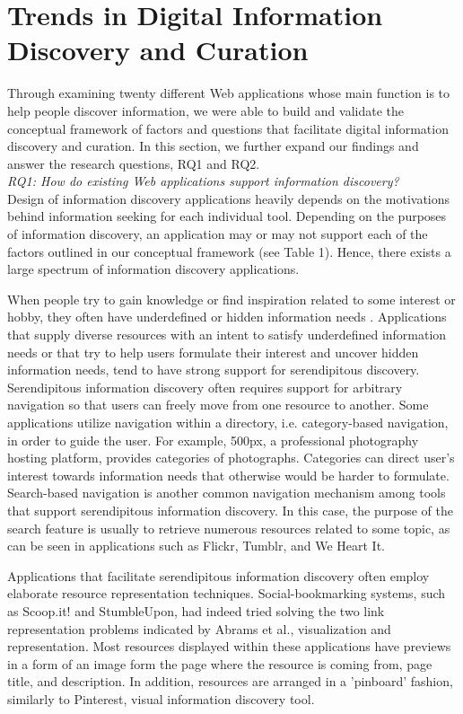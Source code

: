 \documentclass{casconpaper}
\begin{document}
{\section{Trends in Digital Information Discovery and Curation}

Through examining twenty different Web applications whose main function is to help people discover information, we were able to build and validate the conceptual framework of factors and questions that facilitate digital information discovery and curation. In this section, we further expand our findings and answer the research questions, RQ1 and RQ2. \\

\emph{RQ1: How do existing Web applications support information discovery?} \\

Design of information discovery applications heavily depends on the motivations behind information seeking for each individual tool. Depending on the purposes of information discovery, an application may or may not support each of the factors outlined in our conceptual framework (see Table 1). Hence, there exists a large spectrum of information discovery applications.

When people try to gain knowledge or find inspiration related to some interest or hobby, they often have underdefined or hidden information needs \cite{lindley}. Applications that supply diverse resources with an intent to satisfy underdefined information needs or that try to help users formulate their interest and uncover hidden information needs, tend to have strong support for serendipitous discovery. Serendipitous information discovery often requires support for arbitrary navigation so that users can freely move from one resource to another. Some applications utilize navigation within a directory, i.e. category-based navigation, in order to guide the user. For example, 500px, a professional photography hosting platform, provides categories of photographs. Categories can direct user's interest towards information needs that otherwise would be harder to formulate. Search-based navigation is another common navigation mechanism among tools that support serendipitous information discovery. In this case, the purpose of the search feature is usually to retrieve numerous resources related to some topic, as can be seen in applications such as Flickr, Tumblr, and We Heart It. 

Applications that facilitate serendipitous information discovery often employ elaborate resource representation techniques. Social-bookmarking systems, such as Scoop.it! and StumbleUpon, had indeed tried solving the two link representation problems indicated by Abrams et al.\cite{abrams}, visualization and representation.  Most resources displayed within these applications have previews in a form of an image form the page where the resource is coming from, page title, and description. In addition, resources are arranged in a 'pinboard' fashion, similarly to Pinterest, visual information discovery tool.

}
\end{document}

